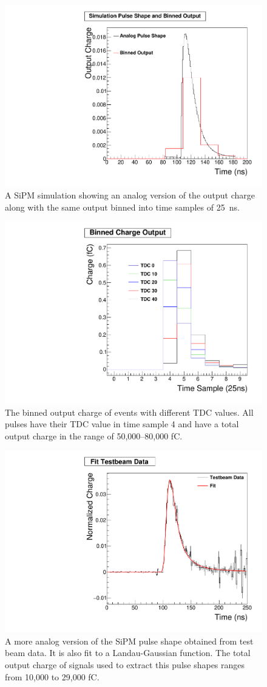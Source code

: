 \begin{figure}
\centering
\includegraphics[width=0.6\linewidth]{Figures/Bin.pdf}
\caption{A SiPM simulation showing an analog version of the output charge along with the same output binned into time samples of 25~ns.}
\label{fig:bin}
\end{figure}

\begin{figure}
\centering
\includegraphics[width=0.6\linewidth]{Figures/Phase.pdf}
\caption{The binned output charge of events with different TDC values. All pulses have their TDC value in time sample 4 and have a total output charge in the range of 50,000--80,000 fC.}
\label{fig:Phase}
\end{figure}

\begin{figure}
\centering
\includegraphics[width=0.6\linewidth]{Figures/FittedPlot.pdf}
\caption{A more analog version of the SiPM pulse shape obtained from test beam data. It is also fit to a Landau-Gaussian function. The total output charge of signals used to extract this pulse shapes ranges from 10,000 to 29,000 fC.}
\label{fig:fit}
\end{figure}


